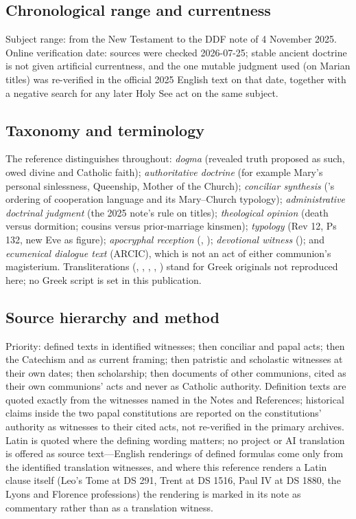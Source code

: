 \subsection*{Chronological range and currentness}

Subject range: from the New Testament to the DDF note of 4 November 2025.
Online verification date: sources were checked 2026-07-25; stable ancient
doctrine is not given artificial currentness, and the one mutable
judgment used (on Marian titles) was re-verified in the official 2025
English text on that date, together with a negative search for any later
Holy See act on the same subject.

\subsection*{Taxonomy and terminology}

The reference distinguishes throughout: \emph{dogma} (revealed truth
proposed as such, owed divine and Catholic faith); \emph{authoritative
doctrine} (for example Mary's personal sinlessness, Queenship, Mother
of the Church); \emph{conciliar synthesis} ('s
ordering of cooperation language and its Mary--Church typology);
\emph{administrative doctrinal judgment} (the 2025 note's rule on
titles); \emph{theological opinion} (death versus dormition; cousins
versus prior-marriage kinsmen); \emph{typology} (Rev 12, Ps 132, new Eve
as figure); \emph{apocryphal reception} (,
); \emph{devotional witness} (); and \emph{ecumenical dialogue text} (ARCIC), which is not
an act of either communion's magisterium. Transliterations
(, , ,
, ) stand for Greek originals not reproduced
here; no Greek script is set in this publication.

\subsection*{Source hierarchy and method}

Priority: defined texts in identified witnesses; then conciliar and
papal acts; then the Catechism and  as current
framing; then patristic and scholastic witnesses at their own dates;
then scholarship; then documents of other communions, cited as their own
communions' acts and never as Catholic authority. Definition texts are
quoted exactly from the witnesses named in the Notes and References;
historical claims inside the two papal constitutions are reported on the
constitutions' authority as witnesses to their cited acts, not
re-verified in the primary archives. Latin is quoted where the defining
wording matters; no project or AI translation is offered as source
text---English renderings of defined formulas come only from the
identified translation witnesses, and where this reference renders a
Latin clause itself (Leo's Tome at DS 291, Trent at DS 1516, Paul IV at
DS 1880, the Lyons and Florence professions) the rendering is marked in
its note as commentary rather than as a translation witness.

